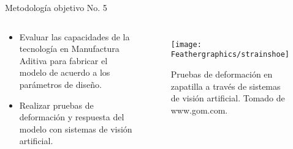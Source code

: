 \documentclass[10pt]{beamer}
\begin{document}
\begin{frame}{Metodología objetivo No. 5}

\begin{columns}[t]


\column{50 mm}
\begin{exampleblock}{}

\begin{itemize}
\item {\footnotesize{}Evaluar las capacidades de la tecnología en Manufactura
Aditiva para fabricar el modelo de acuerdo a los parámetros de diseño.}{\footnotesize \par}
\item {\footnotesize{}Realizar pruebas de deformación y respuesta del modelo
con sistemas de visión artificial.}{\footnotesize \par}
\end{itemize}
\end{exampleblock}

\column{60 mm}

\begin{figure}
\begin{centering}
{\scriptsize{}\texttt{[image: Feathergraphics/strainshoe]}}
\par\end{centering}{\scriptsize \par}
\caption{{\scriptsize{}Pruebas de deformación en zapatilla a través de sistemas
de visión artificial. Tomado de www.gom.com.}}
\end{figure}

\end{columns}

\end{frame}
\end{document}
